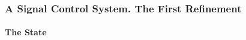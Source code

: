 














\begin{frame}
  \frametitle{A Signal Control System. The First Refinement}
  \framesubtitle{The State}
  \begin{center}
    
  \end{center}
\end{frame}

